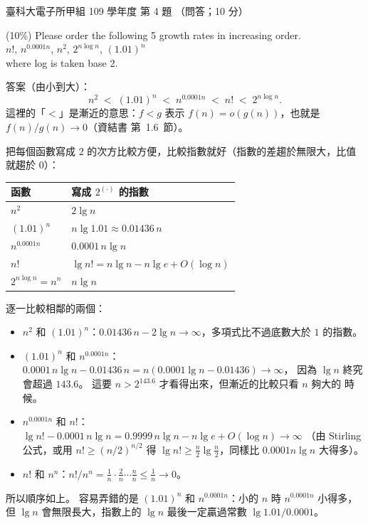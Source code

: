 \begin{pastexam}[label={px:ntust-109-et-ds-04}]{臺科大電子所甲組 109 學年度 第 4 題}
（問答；10 分）

(10\%) Please order the following 5 growth rates in increasing order.\\
$n!$, $n^{0.0001n}$, $n^2$, $2^{n\log n}$, $(1.01)^n$\\
where log is taken base 2.
\end{pastexam}

\begin{pastsoln}
答案（由小到大）：
\[
n^2 \;<\; (1.01)^n \;<\; n^{0.0001n} \;<\; n! \;<\; 2^{n\log n}.
\]
這裡的「$<$」是漸近的意思：$f < g$ 表示 $f(n) = o(g(n))$，也就是 $f(n)/g(n) \to 0$（資結書
第~1.6~節）。

把每個函數寫成 $2$ 的次方比較方便，比較指數就好（指數的差趨於無限大，比值就趨於 $0$）：
\begin{center}
\begin{tabular}{ll}
\toprule
函數 & 寫成 $2^{(\cdot)}$ 的指數 \\
\midrule
$n^2$ & $2\lg n$ \\
$(1.01)^n$ & $n \lg 1.01 \approx 0.01436\,n$ \\
$n^{0.0001n}$ & $0.0001\, n \lg n$ \\
$n!$ & $\lg n! = n\lg n - n\lg e + O(\log n)$ \\
$2^{n\log n} = n^n$ & $n \lg n$ \\
\bottomrule
\end{tabular}
\end{center}
逐一比較相鄰的兩個：
\begin{itemize}
\item $n^2$ 和 $(1.01)^n$：$0.01436\,n - 2\lg n \to \infty$，多項式比不過底數大於 $1$ 的指數。
\item $(1.01)^n$ 和 $n^{0.0001n}$：$0.0001\,n\lg n - 0.01436\,n = n(0.0001\lg n - 0.01436) \to \infty$，
因為 $\lg n$ 終究會超過 $143.6$。 這要 $n > 2^{143.6}$ 才看得出來，但漸近的比較只看 $n$ 夠大的
時候。
\item $n^{0.0001n}$ 和 $n!$：$\lg n! - 0.0001\, n\lg n = 0.9999\, n\lg n - n\lg e + O(\log n) \to \infty$
（由 Stirling 公式，或用 $n! \ge (n/2)^{n/2}$ 得 $\lg n! \ge \frac{n}{2}\lg\frac{n}{2}$，同樣比
$0.0001 n\lg n$ 大得多）。
\item $n!$ 和 $n^n$：$n!/n^n = \frac{1}{n}\cdot\frac{2}{n}\cdots\frac{n}{n} \le \frac{1}{n} \to 0$。
\end{itemize}
所以順序如上。 容易弄錯的是 $(1.01)^n$ 和 $n^{0.0001n}$：小的 $n$ 時 $n^{0.0001n}$ 小得多，但
$\lg n$ 會無限長大，指數上的 $\lg n$ 最後一定贏過常數 $\lg 1.01 / 0.0001$。
\end{pastsoln}
